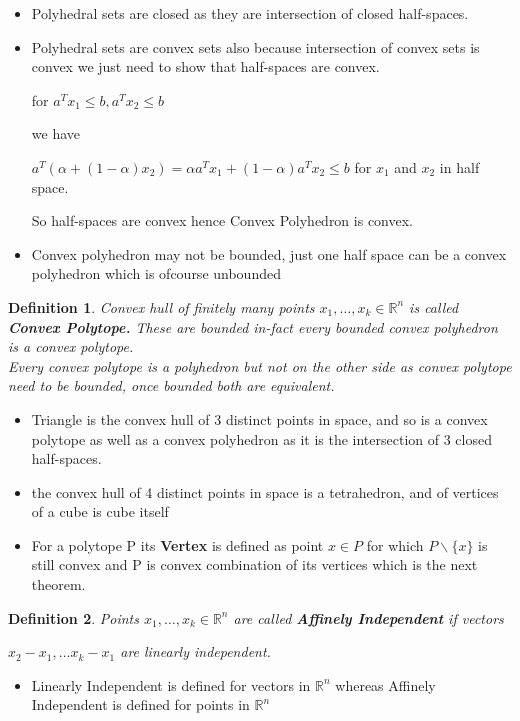 \documentclass[oneside]{book}
\newtheorem{mydef}{Definition}
\begin{document}
\begin{itemize}
\item
 Polyhedral sets are closed as they are intersection of closed half-spaces. 
  \item
 Polyhedral sets  are convex sets  also because intersection of convex sets is convex we just need to show that half-spaces are convex.\par
   for $a^{T} x_{1} \leq b, a^{T} x_{2} \leq b$ \par 
 we have 
 
 $a^{T}\left(\alpha +(1- \alpha) x_{2}\right)=\alpha a^{T} x_{1}+(1-\alpha) a^{T} x_{2} \leq b$ 
  for $x_{1} $ and $x_{2}$ in half space.  \par
  So half-spaces are convex hence  Convex Polyhedron  is convex.\par 
  \item
   Convex polyhedron may not be bounded, just one half space can be a convex polyhedron which is ofcourse unbounded 
   \end{itemize}
   
  \begin{mydef}
  
  Convex hull of finitely many points $x_1,\ldots ,x_k \in \mathbb{R}^n $ is called \textbf{Convex Polytope.} 
 These are bounded in-fact every bounded convex polyhedron is a convex polytope.\\
  Every convex polytope is a polyhedron but not on the other side as convex polytope need to be bounded, once bounded both are equivalent.
 
 
  \end{mydef}
  

\begin{itemize}
\item

Triangle is the convex hull of 3 distinct points in space, and so is a convex polytope as well as a convex polyhedron as it is the intersection of 3 closed half-spaces.

\item
  the convex hull of 4 distinct points in space is a tetrahedron, and of vertices of a cube is cube itself 
 
 \item
 For a polytope P its \textbf{Vertex} is defined as point $x \in P$ for which $P \backslash \{x\} $ is  still convex and P is convex combination of its vertices which is  the next theorem. 
 \end{itemize}
\begin{mydef}

 Points $ x_1, \ldots ,x_k \in \mathbb{R}^n $ are called \textbf{Affinely Independent} if vectors \par
 $x_{2} - x_{1}, \ldots  x_{k} - x_{1} $ are linearly independent.
 \end{mydef}  
 \begin{itemize}
 \item Linearly Independent is defined for vectors in $\mathbb{R}^n $ whereas Affinely Independent is defined for points in $\mathbb{R}^n $
 \end{itemize}
\end{document}

